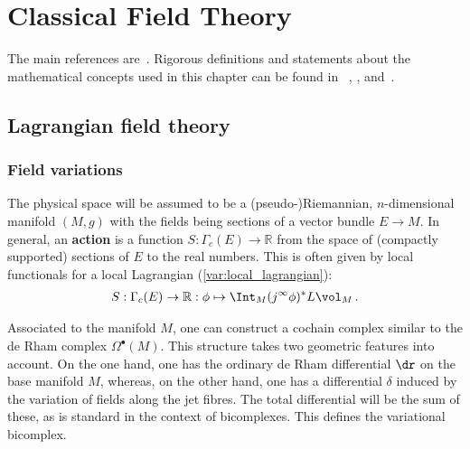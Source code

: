\chapter{Classical Field Theory}\label{chapter:classical_fields}

    The main references are~\cite{anderson_variational_1992,harlow_covariant_2020,barnich_surface_2008}. Rigorous definitions and statements about the mathematical concepts used in this chapter can be found in ~, ,  and~.

    \minitoc

\section{Lagrangian field theory}
\subsection{Field variations}

    The physical space will be assumed to be a (pseudo-)Riemannian, $n$-dimensional manifold $(M,g)$ with the fields being sections of a vector bundle $E\rightarrow M$. In general, an \textbf{action} is a function $S:\Gamma_c(E)\rightarrow\mathbb{R}$ from the space of (compactly supported) sections of $E$ to the real numbers. This is often given by local functionals for a local Lagrangian (\cref{var:local_lagrangian}):
    \begin{gather}
        S:\Gamma_c(E)\rightarrow\mathbb{R}:\phi\mapsto\Int_M(j^\infty\phi)^*L\vol_M\,.
    \end{gather}

    Associated to the manifold $M$, one can construct a cochain complex similar to the de Rham complex $\Omega^\bullet(M)$. This structure takes two geometric features into account. On the one hand, one has the ordinary de Rham differential $\dr$ on the base manifold $M$, whereas, on the other hand, one has a differential $\delta$ induced by the variation of fields along the jet fibres. The total differential will be the sum of these, as is standard in the context of bicomplexes. This defines the variational bicomplex.

